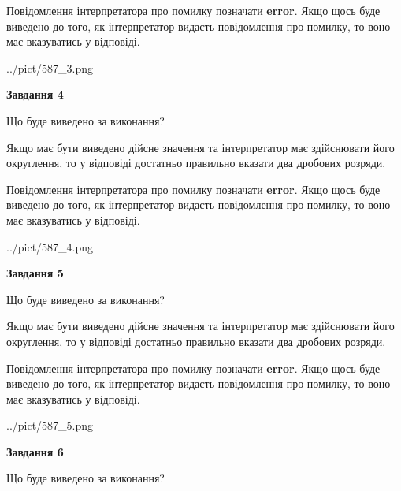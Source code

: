 \documentclass[12pt, ukrainian]{article}
\begin{document}
{\begin {Large}
Повідомлення інтерпретатора про помилку позначати \textbf{error}.
Якщо щось буде виведено до того, як інтерпретатор видасть повідомлення про помилку, 
то воно має вказуватись у відповіді. \par

\begin{center}
	{../pict/587_3.png}
\end{center}
\newpage

{\begin {center}\textbf{Завдання 4}\end {center}}\par
Що буде виведено за виконання? \par

Якщо має бути виведено дійсне значення та інтерпретатор має здійснювати його округлення, 
то у відповіді достатньо правильно вказати два дробових розряди.

Повідомлення інтерпретатора про помилку позначати \textbf{error}.
Якщо щось буде виведено до того, як інтерпретатор видасть повідомлення про помилку, 
то воно має вказуватись у відповіді. \par

\begin{center}
	{../pict/587_4.png}
\end{center}
\newpage

{\begin {center}\textbf{Завдання 5}\end {center}}\par
Що буде виведено за виконання? \par

Якщо має бути виведено дійсне значення та інтерпретатор має здійснювати його округлення, 
то у відповіді достатньо правильно вказати два дробових розряди.

Повідомлення інтерпретатора про помилку позначати \textbf{error}.
Якщо щось буде виведено до того, як інтерпретатор видасть повідомлення про помилку, 
то воно має вказуватись у відповіді. \par

\begin{center}
	{../pict/587_5.png}
\end{center}
\newpage

{\begin {center}\textbf{Завдання 6}\end {center}}\par
Що буде виведено за виконання? \par


\end{Large}}
\end{document}
